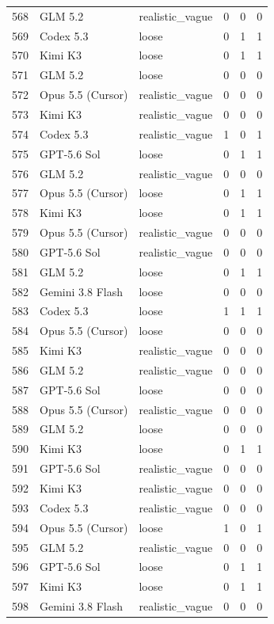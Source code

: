 \begin{tabular}{llllll}
568 & GLM 5.2 & realistic\_vague & 0 & 0 & 0 \\
569 & Codex 5.3 & loose & 0 & 1 & 1 \\
570 & Kimi K3 & loose & 0 & 1 & 1 \\
571 & GLM 5.2 & loose & 0 & 0 & 0 \\
572 & Opus 5.5 (Cursor) & realistic\_vague & 0 & 0 & 0 \\
573 & Kimi K3 & realistic\_vague & 0 & 0 & 0 \\
574 & Codex 5.3 & realistic\_vague & 1 & 0 & 1 \\
575 & GPT-5.6 Sol & loose & 0 & 1 & 1 \\
576 & GLM 5.2 & realistic\_vague & 0 & 0 & 0 \\
577 & Opus 5.5 (Cursor) & loose & 0 & 1 & 1 \\
578 & Kimi K3 & loose & 0 & 1 & 1 \\
579 & Opus 5.5 (Cursor) & realistic\_vague & 0 & 0 & 0 \\
580 & GPT-5.6 Sol & realistic\_vague & 0 & 0 & 0 \\
581 & GLM 5.2 & loose & 0 & 1 & 1 \\
582 & Gemini 3.8 Flash & loose & 0 & 0 & 0 \\
583 & Codex 5.3 & loose & 1 & 1 & 1 \\
584 & Opus 5.5 (Cursor) & loose & 0 & 0 & 0 \\
585 & Kimi K3 & realistic\_vague & 0 & 0 & 0 \\
586 & GLM 5.2 & realistic\_vague & 0 & 0 & 0 \\
587 & GPT-5.6 Sol & loose & 0 & 0 & 0 \\
588 & Opus 5.5 (Cursor) & realistic\_vague & 0 & 0 & 0 \\
589 & GLM 5.2 & loose & 0 & 0 & 0 \\
590 & Kimi K3 & loose & 0 & 1 & 1 \\
591 & GPT-5.6 Sol & realistic\_vague & 0 & 0 & 0 \\
592 & Kimi K3 & realistic\_vague & 0 & 0 & 0 \\
593 & Codex 5.3 & realistic\_vague & 0 & 0 & 0 \\
594 & Opus 5.5 (Cursor) & loose & 1 & 0 & 1 \\
595 & GLM 5.2 & realistic\_vague & 0 & 0 & 0 \\
596 & GPT-5.6 Sol & loose & 0 & 1 & 1 \\
597 & Kimi K3 & loose & 0 & 1 & 1 \\
598 & Gemini 3.8 Flash & realistic\_vague & 0 & 0 & 0 \\

\end{tabular}
